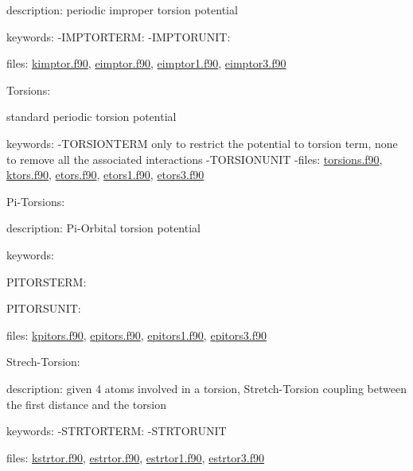 \begin{DoxyItemize}
\begin{DoxyItemize}
\item description\-: periodic improper torsion potential
\item keywords\-: -\/\-I\-M\-P\-T\-O\-R\-T\-E\-R\-M\-: -\/\-I\-M\-P\-T\-O\-R\-U\-N\-I\-T\-:
\item files\-: \hyperlink{kimptor_8f90}{kimptor.\-f90}, \hyperlink{eimptor_8f90}{eimptor.\-f90}, \hyperlink{eimptor1_8f90}{eimptor1.\-f90}, \hyperlink{eimptor3_8f90}{eimptor3.\-f90}
\end{DoxyItemize}
\item Torsions\-:
\begin{DoxyItemize}
\item standard periodic torsion potential
\item keywords\-: -\/\-T\-O\-R\-S\-I\-O\-N\-T\-E\-R\-M only to restrict the potential to torsion term, none to remove all the associated interactions -\/\-T\-O\-R\-S\-I\-O\-N\-U\-N\-I\-T -\/files\-: \hyperlink{torsions_8f90}{torsions.\-f90}, \hyperlink{ktors_8f90}{ktors.\-f90}, \hyperlink{etors_8f90}{etors.\-f90}, \hyperlink{etors1_8f90}{etors1.\-f90}, \hyperlink{etors3_8f90}{etors3.\-f90}
\end{DoxyItemize}
\item Pi-\/\-Torsions\-:
\begin{DoxyItemize}
\item description\-: Pi-\/\-Orbital torsion potential
\item keywords\-:
\begin{DoxyItemize}
\item P\-I\-T\-O\-R\-S\-T\-E\-R\-M\-:
\item P\-I\-T\-O\-R\-S\-U\-N\-I\-T\-:
\end{DoxyItemize}
\item files\-: \hyperlink{kpitors_8f90}{kpitors.\-f90}, \hyperlink{epitors_8f90}{epitors.\-f90}, \hyperlink{epitors1_8f90}{epitors1.\-f90}, \hyperlink{epitors3_8f90}{epitors3.\-f90}
\end{DoxyItemize}
\item Strech-\/\-Torsion\-:
\begin{DoxyItemize}
\item description\-: given 4 atoms involved in a torsion, Stretch-\/\-Torsion coupling between the first distance and the torsion
\item keywords\-: -\/\-S\-T\-R\-T\-O\-R\-T\-E\-R\-M\-: -\/\-S\-T\-R\-T\-O\-R\-U\-N\-I\-T
\item files\-: \hyperlink{kstrtor_8f90}{kstrtor.\-f90}, \hyperlink{estrtor_8f90}{estrtor.\-f90}, \hyperlink{estrtor1_8f90}{estrtor1.\-f90}, \hyperlink{estrtor3_8f90}{estrtor3.\-f90}

\end{DoxyItemize}
\end{DoxyItemize}

